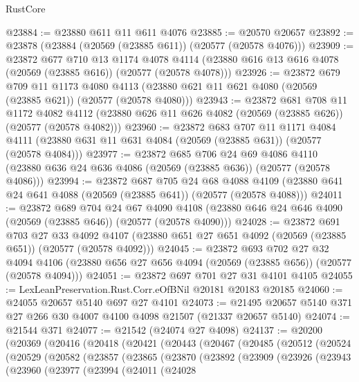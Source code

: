 \begin{lexlean}{RustCore}
\begin{coremodule}
@23884 := @23880 @611 @11 @611 @4076
@23885 := @20570 @20657
@23892 := @23878 (@23884 (@20569 (@23885 @611)) (@20577 (@20578 @4076)))
@23909 := @23872
    @677
    @710
    @13
    @1174
    @4078
    @4114
    (@23880 @616 @13 @616 @4078 (@20569 (@23885 @616)) (@20577 (@20578 @4078)))
@23926 := @23872
    @679
    @709
    @11
    @1173
    @4080
    @4113
    (@23880 @621 @11 @621 @4080 (@20569 (@23885 @621)) (@20577 (@20578 @4080)))
@23943 := @23872
    @681
    @708
    @11
    @1172
    @4082
    @4112
    (@23880 @626 @11 @626 @4082 (@20569 (@23885 @626)) (@20577 (@20578 @4082)))
@23960 := @23872
    @683
    @707
    @11
    @1171
    @4084
    @4111
    (@23880 @631 @11 @631 @4084 (@20569 (@23885 @631)) (@20577 (@20578 @4084)))
@23977 := @23872
    @685
    @706
    @24
    @69
    @4086
    @4110
    (@23880 @636 @24 @636 @4086 (@20569 (@23885 @636)) (@20577 (@20578 @4086)))
@23994 := @23872
    @687
    @705
    @24
    @68
    @4088
    @4109
    (@23880 @641 @24 @641 @4088 (@20569 (@23885 @641)) (@20577 (@20578 @4088)))
@24011 := @23872
    @689
    @704
    @24
    @67
    @4090
    @4108
    (@23880 @646 @24 @646 @4090 (@20569 (@23885 @646)) (@20577 (@20578 @4090)))
@24028 := @23872
    @691
    @703
    @27
    @33
    @4092
    @4107
    (@23880 @651 @27 @651 @4092 (@20569 (@23885 @651)) (@20577 (@20578 @4092)))
@24045 := @23872
    @693
    @702
    @27
    @32
    @4094
    @4106
    (@23880 @656 @27 @656 @4094 (@20569 (@23885 @656)) (@20577 (@20578 @4094)))
@24051 := @23872 @697 @701 @27 @31 @4101 @4105
@24055 := LexLeanPreservation.Rust.Corr.eOfBNil @20181 @20183 @20185
@24060 := @24055 @20657 @5140 @697 @27 @4101
@24073 := @21495 @20657 @5140 @371 @27 @266 @30 @4007 @4100 @4098 @21507 (@21337 @20657 @5140)
@24074 := @21544 @371
@24077 := @21542 (@24074 @27 @4098)
@24137 := @20200
    (@20369
      (@20416
        (@20418
          (@20421
            (@20443
              (@20467
                (@20485
                  (@20512
                    (@20524
                      (@20529
                        (@20582
                          (@23857
                            (@23865
                              (@23870
                                (@23892
                                  (@23909
                                    (@23926
                                      (@23943
                                        (@23960
                                          (@23977
                                            (@23994
                                              (@24011
                                                (@24028

\end{coremodule}
\end{lexlean}
